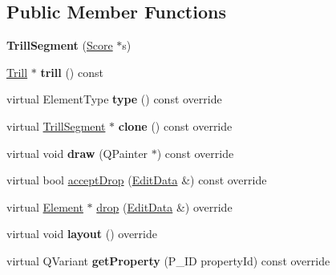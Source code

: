 \subsection*{Public Member Functions}
\begin{DoxyCompactItemize}
\item 
\mbox{\label{class_ms_1_1_trill_segment_a5156545c8980bfd80721fe14231383c5}} 
{\bfseries Trill\+Segment} (\hyperlink{class_ms_1_1_score}{Score} $\ast$s)
\item 
\mbox{\label{class_ms_1_1_trill_segment_a5ba6a475d7cb8d1cac899f2e5b3615c3}} 
\hyperlink{class_ms_1_1_trill}{Trill} $\ast$ {\bfseries trill} () const
\item 
\mbox{\label{class_ms_1_1_trill_segment_afe0cead5a003bf7cff2ab6ee03518dec}} 
virtual Element\+Type {\bfseries type} () const override
\item 
\mbox{\label{class_ms_1_1_trill_segment_ab6be2ea673d9609ffb2d08765cec161f}} 
virtual \hyperlink{class_ms_1_1_trill_segment}{Trill\+Segment} $\ast$ {\bfseries clone} () const override
\item 
\mbox{\label{class_ms_1_1_trill_segment_a96dc82fd77d19e04d51e648006b6f830}} 
virtual void {\bfseries draw} (Q\+Painter $\ast$) const override
\item 
virtual bool \hyperlink{class_ms_1_1_trill_segment_aec0e095f72a35b9287721214ffb68b9f}{accept\+Drop} (\hyperlink{class_ms_1_1_edit_data}{Edit\+Data} \&) const override
\item 
virtual \hyperlink{class_ms_1_1_element}{Element} $\ast$ \hyperlink{class_ms_1_1_trill_segment_a743f071ab284f933eefa50dac98b7dde}{drop} (\hyperlink{class_ms_1_1_edit_data}{Edit\+Data} \&) override
\item 
\mbox{\label{class_ms_1_1_trill_segment_a0a19c60d18260130abc750359e65c508}} 
virtual void {\bfseries layout} () override
\item 
\mbox{\label{class_ms_1_1_trill_segment_acd68745d413a0cdefa4bda7e5d6c9a10}} 
virtual Q\+Variant {\bfseries get\+Property} (P\+\_\+\+ID property\+Id) const override

\end{DoxyCompactItemize}
